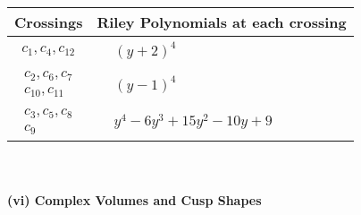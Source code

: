 \documentclass[1p]{elsarticle_modified}
\theoremstyle{definition}
\begin{document}
\begin{tabular}{m{50pt}|m{274pt}}
Crossings & \hspace{64pt}Riley Polynomials at each crossing \\
\hline $$\begin{aligned}c_{1},c_{4},c_{12}\end{aligned}$$&$\begin{aligned}
&(y+2)^4
\end{aligned}$\\
\hline $$\begin{aligned}c_{2},c_{6},c_{7}\\c_{10},c_{11}\end{aligned}$$&$\begin{aligned}
&(y-1)^4
\end{aligned}$\\
\hline $$\begin{aligned}c_{3},c_{5},c_{8}\\c_{9}\end{aligned}$$&$\begin{aligned}
&y^4-6 y^3+15 y^2-10 y+9
\end{aligned}$\\
\hline
\end{tabular}\\~\\
\newpage\flushleft \textbf{(vi) Complex Volumes and Cusp Shapes}
\end{document}
